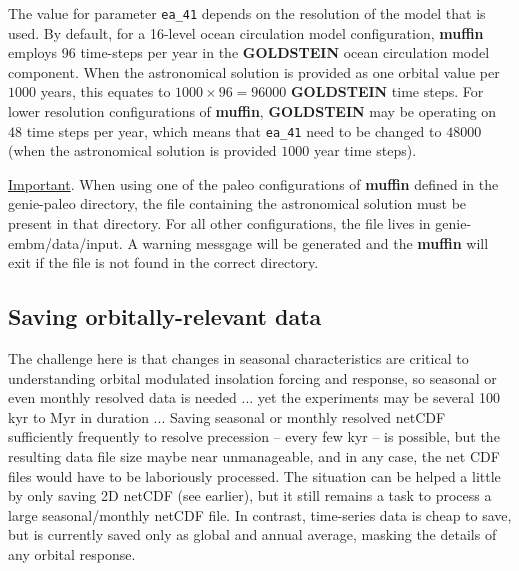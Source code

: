 \documentclass[11pt,fleqn]{book} %
\begin{document}
The value for parameter \texttt{ea\_41} depends on the resolution of the model that is used. By default, for a 16-level ocean circulation model configuration, \textbf{muffin} employs 96  time-steps per year in the \textbf{GOLDSTEIN} ocean circulation model component. When the astronomical solution is provided as one orbital value per \(1000\) years, this equates to \(1000\times96=96000\) \textbf{GOLDSTEIN} time steps. For lower resolution configurations of \textbf{muffin}, \textbf{GOLDSTEIN} may be operating on \(48\) time steps per year, which means that \texttt{ea\_41} need to be changed to \(48000\) (when the astronomical solution is provided \(1000\) year time steps).

\uline{Important}. When using one of the paleo configurations of \textbf{muffin} defined in the \textsf{\footnotesize genie-paleo } directory, the file containing the astronomical solution must be present in that directory. For all other configurations, the file lives in \footnotesize\textsf{genie-embm/data/input}\normalsize. A warning messgage will be generated and the \textbf{muffin} will exit if the file is not found in the correct directory.

%
\subsection*{Saving orbitally-relevant data}

The challenge here is that   changes in seasonal characteristics are critical to understanding orbital modulated insolation forcing and response, so seasonal or even monthly resolved data is needed ... yet the  experiments may be several 100 kyr to Myr in duration ... Saving seasonal or monthly resolved netCDF sufficiently frequently to resolve precession -- every few kyr -- is possible, but the resulting data file size maybe near unmanageable, and in any case, the net CDF files would have to be laboriously processed. The situation can be helped a little by only saving 2D netCDF (see earlier), but it still remains a task to process a large seasonal/monthly netCDF file. In contrast, time-series data is cheap to save, but is currently saved only as global and annual average, masking the details of any orbital response.
\end{document}
